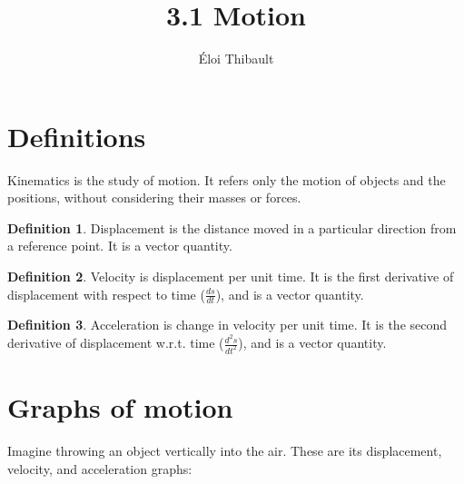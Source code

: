 \documentclass[11pt]{article}
\title{3.1 Motion}
\author{Éloi Thibault}
\begin{document}
\theoremstyle{definition}
\newtheorem{definition}{Definition}[section]

\maketitle

\section{Definitions}

Kinematics is the study of motion. It refers only the motion of objects and the positions, without considering their masses or forces.

\begin{definition}
	Displacement is the distance moved in a particular direction from a reference point. It is a vector quantity.
\end{definition}

\begin{definition}
	Velocity is displacement per unit time. It is the first derivative of displacement with respect to time ($\frac{ds}{dt}$), and is a vector quantity.
\end{definition}

\begin{definition}
	Acceleration is change in velocity per unit time. It is the second derivative of displacement w.r.t. time ($\frac{d^2s}{dt^2}$), and is a vector quantity.
\end{definition}

\section{Graphs of motion}

Imagine throwing an object vertically into the air. These are its displacement, velocity, and acceleration graphs:
\end{document}

